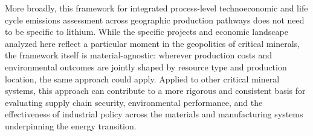 More broadly, this framework for integrated process-level technoeconomic and life cycle emissions assessment across geographic production pathways does not need to be specific to lithium. While the specific projects and economic landscape analyzed here reflect a particular moment in the geopolitics of critical minerals, the framework itself is material-agnostic: wherever production costs and environmental outcomes are jointly shaped by resource type and production location, the same approach could apply. Applied to other critical mineral systems, this approach can contribute to a more rigorous and consistent basis for evaluating supply chain security, environmental performance, and the effectiveness of industrial policy across the materials and manufacturing systems underpinning the energy transition.